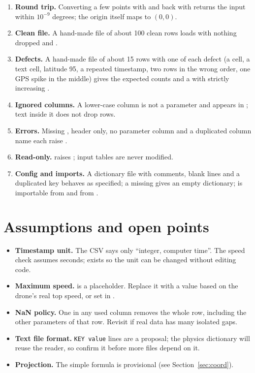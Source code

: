 \documentclass{article}
\begin{document}
\begin{enumerate}
\item \textbf{Round trip.} Converting a few points with 
      and back with  returns the input within
      $10^{-9}$ degrees; the origin itself maps to $(0,0)$.
\item \textbf{Clean file.} A hand-made file of about 100 clean rows loads with
      nothing dropped and .
\item \textbf{Defects.} A hand-made file of about 15 rows with one of each
      defect (a  cell, a text cell, latitude 95, a repeated
      timestamp, two rows in the wrong order, one GPS spike in the middle)
      gives the expected  counts and a  with
      strictly increasing .
\item \textbf{Ignored columns.} A lower-case column is not a parameter and
      appears in ; text inside it does not drop rows.
\item \textbf{Errors.} Missing , header only, no parameter
      column and a duplicated column name each raise .
\item \textbf{Read-only.}  raises ;
      input tables are never modified.
\item \textbf{Config and imports.} A dictionary file with comments, blank lines
      and a duplicated key behaves as specified; a missing 
      gives an empty dictionary;  is importable from
       and  from
      .
\end{enumerate}

\section{Assumptions and open points}
\label{sec:open}

\begin{itemize}
\item \textbf{Timestamp unit.} The CSV says only ``integer, computer time''.
      The speed check assumes seconds;  exists so the
      unit can be changed without editing code.
\item \textbf{Maximum speed.}  is a
      placeholder. Replace it with a value based on the drone's real top
      speed, or set  in .
\item \textbf{NaN policy.} One  in any used column removes the whole
      row, including the other parameters of that row. Revisit if real data
      has many isolated gaps.
\item \textbf{Text file format.} \texttt{KEY value} lines are a proposal; the
      physics dictionary will reuse the reader, so confirm it before more
      files depend on it.
\item \textbf{Projection.} The simple formula is provisional (see
      Section~\ref{sec:coord}).
\end{itemize}
\end{document}
